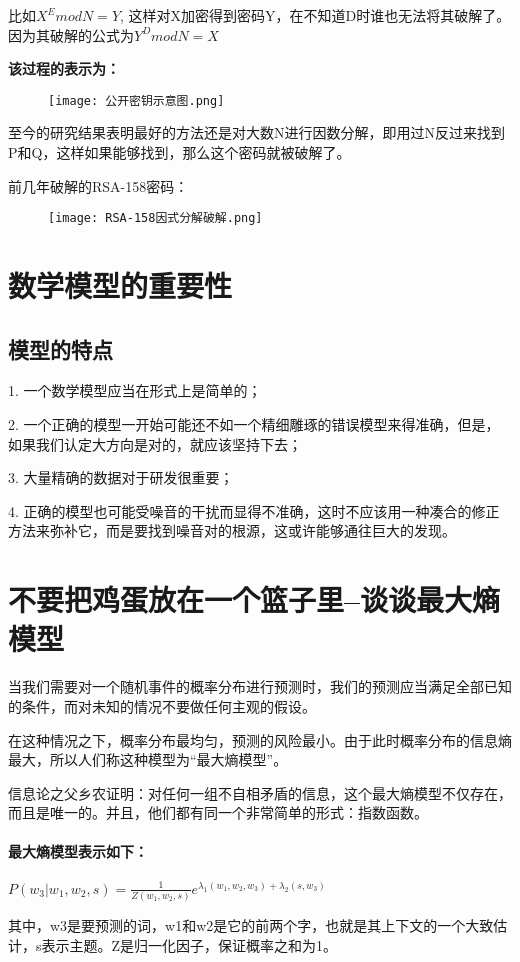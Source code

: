\documentclass[UTF8]{article}
\begin{document}
	比如$X^E mod N = Y$, 这样对X加密得到密码Y，在不知道D时谁也无法将其破解了。因为其破解的公式为$Y^D mod N = X$

	\textbf{该过程的表示为：}
	\begin{figure}[!htb]
	\centering
	\texttt{[image: 公开密钥示意图.png]}
	\end{figure}

	至今的研究结果表明最好的方法还是对大数N进行因数分解，即用过N反过来找到P和Q，这样如果能够找到，那么这个密码就被破解了。

	前几年破解的RSA-158密码：

	\begin{figure}[!htb]
	\centering
	\texttt{[image: RSA-158因式分解破解.png]}
	\end{figure}

	\section{数学模型的重要性}
	\subsection{模型的特点}
	1. 一个数学模型应当在形式上是简单的；

	2. 一个正确的模型一开始可能还不如一个精细雕琢的错误模型来得准确，但是，如果我们认定大方向是对的，就应该坚持下去；

	3. 大量精确的数据对于研发很重要；

	4. 正确的模型也可能受噪音的干扰而显得不准确，这时不应该用一种凑合的修正方法来弥补它，而是要找到噪音对的根源，这或许能够通往巨大的发现。

	\section{不要把鸡蛋放在一个篮子里--谈谈最大熵模型}
	当我们需要对一个随机事件的概率分布进行预测时，我们的预测应当满足全部已知的条件，而对未知的情况不要做任何主观的假设。

	在这种情况之下，概率分布最均匀，预测的风险最小。由于此时概率分布的信息熵最大，所以人们称这种模型为“最大熵模型”。

	信息论之父乡农证明：对任何一组不自相矛盾的信息，这个最大熵模型不仅存在，而且是唯一的。并且，他们都有同一个非常简单的形式：指数函数。

	\paragraph{最大熵模型表示如下：}
	$P(w_3|w_1,w_2,s)=\frac{1}{Z(w_1,w_2,s)}e^{\lambda _1(w_1,w_2,w_3)+\lambda _2(s,w_3)}$

	其中，w3是要预测的词，w1和w2是它的前两个字，也就是其上下文的一个大致估计，s表示主题。Z是归一化因子，保证概率之和为1。
\end{document}
